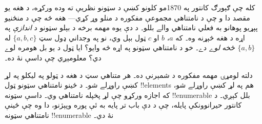 \documentclass[../../../include/open-logic-section]{subfiles}
\begin{document}


کله چې ګېورګ کانتور په 1870مو کلونو کښې د سټونو نظريې ته وده ورکړه،
د هغه يو مقصد دا و چې د نامتناهي مجموعې مفکوره د منلو وړ کړي---
هغه څه چې د منځنيو پېړيو پوهانو به فعلي نامتناهي والے بللو۔ د
دې يوه مهمه برخه د بېلو سټونو د \emph{اندازې} په اړه د هغه
څېړنه وه۔ که $a$، $b$ او $c$ ټول بېل وي، نو په وجداني ډول
سټ $\{a, b, c\}$ له $\{a, b\}$ څخه \emph{لوے} دے۔ خو د
نامتناهي سټونو په اړه څه وايو؟ ايا ټول د يو بل هومره لوے دي؟
معلومېږي چې داسې نۀ ده۔

دلته لومړۍ مهمه مفکوره د شمېرنې ده۔ هر متناهي سټ د هغه د ټولو
 په ليکلو په لړ کښې راوړلے شو۔ د ځينو
نامتناهي سټونو ټول !!{element}s هم په لړ کښې راوړلے شو، که
اجازه ورکړو چې لړ پخپله نامتناهي وي۔ داسې سټونه !!{enumerable}
بلل کېږي۔ د کانتور حيرانوونکې پايله، چې د دې باب تر پايه به
ئې پوره وپېژنو، دا وه چې ځينې نامتناهي سټونه !!{enumerable} نۀ دي۔
\end{document}
